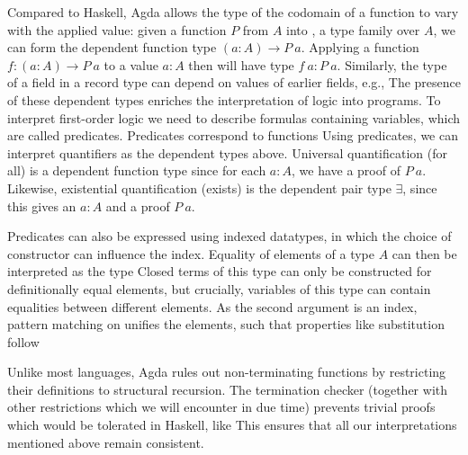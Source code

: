 Compared to Haskell, Agda allows the type of the codomain of a function to vary with the applied value:
given a function $P$ from $A$ into , a type family over $A$, we can form the dependent function type $(a : A) \to P\ a$. Applying a function $f: (a : A) \to P\ a$ to a value $a : A$ then will have type $f\ a : P\ a$. Similarly, the type of a field in a record type can depend on values of earlier fields, e.g.,
The presence of these dependent types enriches the interpretation of logic into programs. To interpret first-order logic we need to describe formulas containing variables, which are called predicates. Predicates correspond to functions%
Using predicates, we can interpret quantifiers as the dependent types above. Universal quantification (for all) is a dependent function type 
since for each $a : A$, we have a proof of $P\ a$. Likewise, existential quantification (exists) is the dependent pair type $\exists$, since this gives an $a : A$ and a proof $P\ a$. 

Predicates can also be expressed using indexed datatypes, in which the choice of constructor can influence the index. Equality of elements of a type $A$ can then be interpreted as the type
Closed terms of this type can only be constructed for definitionally equal elements, but crucially, variables of this type can contain equalities between different elements. As the second argument is an index, pattern matching on  unifies the elements, such that properties like substitution follow

Unlike most languages, Agda rules out non-terminating functions by restricting their definitions to structural recursion. The termination checker (together with other restrictions which we will encounter in due time) prevents trivial proofs which would be tolerated in Haskell, like
This ensures that all our interpretations mentioned above remain consistent.

\begin{comment}
With this, we can do maths. For example, we could define natural numbers as an inductive type
\[ \dots \]
and prove some properties of prime numbers. But to get the same results to binary numbers (without duplicating the proofs), we need a bit more. The usual notion of equalities of types are isomorphisms: two types $A, B$ are isomorphic if there are functions $A \to B$ and $B \to A$, which are mutually inverse 
\[ \dots \]
In ordinary Agda, we cannot directly apply these to transport along like we can for equalities, however.
\end{comment}


